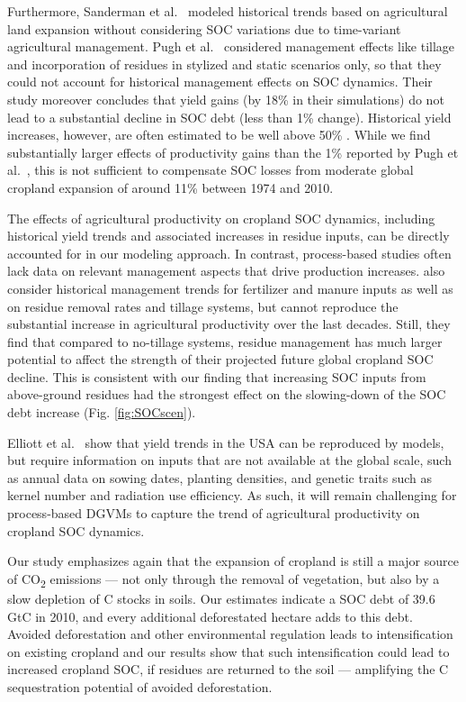 \documentclass[gc, manuscript]{copernicus}
\begin{document}
Furthermore, Sanderman et al.~\citeyearpar{sanderman_soil_2017} modeled historical trends based on agricultural land expansion without considering SOC variations due to time-variant agricultural management. Pugh et al.~\citeyearpar{pugh_simulated_2015} considered management effects like tillage and incorporation of residues in stylized and static scenarios only, so that they could not account for historical management effects on SOC dynamics. Their study moreover concludes that yield gains (by 18\% in their simulations) do not lead to a substantial decline in SOC debt (less than 1\% change). Historical yield increases, however, are often estimated to be well above 50\% \citep{pellegrini_crop_2018, ray_recent_2012, rudel_agricultural_2009}. While we find substantially larger effects of productivity gains than the 1\% reported by Pugh et al.~\citeyearpar{pugh_simulated_2015}, this is not sufficient to compensate SOC losses from moderate global cropland expansion of around 11\% between 1974 and 2010.

The effects of agricultural productivity on cropland SOC dynamics, including historical yield trends and associated increases in residue inputs, can be directly accounted for in our modeling approach. In contrast, process-based studies \citep{pugh_simulated_2015, herzfeld_soc_2021} often lack data on relevant management aspects that drive production increases. \citep{herzfeld_soc_2021} also consider historical management trends for fertilizer and manure inputs as well as on residue removal rates and tillage systems, but cannot reproduce the substantial increase in agricultural productivity over the last decades. Still, they find that compared to no-tillage systems, residue management has much larger potential to affect the strength of their projected future global cropland SOC decline. This is consistent with our finding that increasing SOC inputs from above-ground residues had the strongest effect on the slowing-down of the SOC debt increase (Fig. \ref{fig:SOCscen}).

Elliott et al.~\citeyearpar{elliott_management_trends_2018} show that yield trends in the USA can be reproduced by models, but require information on inputs that are not available at the global scale, such as annual data on sowing dates, planting densities, and genetic traits such as kernel number and radiation use efficiency. As such, it will remain challenging for process-based DGVMs to capture the trend of agricultural productivity on cropland SOC dynamics.

Our study emphasizes again that the expansion of cropland is still a major source of CO\textsubscript{2} emissions --- not only through the removal of vegetation, but also by a slow depletion of C stocks in soils. Our estimates indicate a SOC debt of 39.6 GtC in 2010, and every additional deforestated hectare adds to this debt. Avoided deforestation and other environmental regulation leads to intensification on existing cropland \citep{humpenoder_large-scale_2018} and our results show that such intensification could lead to increased cropland SOC, if residues are returned to the soil --- amplifying the C sequestration potential of avoided deforestation.
\end{document}
